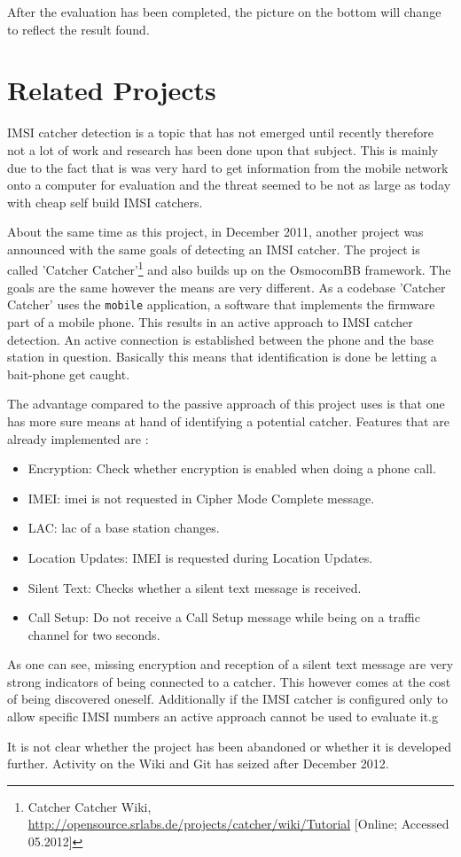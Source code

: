 After the evaluation has been completed, the picture on the bottom will change to reflect the result found.

\section{Related Projects}
IMSI catcher detection is a topic that has not emerged until recently therefore not a lot of work and research has been done upon that subject.
This is mainly due to the fact that is was very hard to get information from the mobile network onto a computer for evaluation and the threat seemed to be not as large as today with cheap self build IMSI catchers.

About the same time as this project, in December 2011, another project was announced with the same goals of detecting an IMSI catcher.
The project is called 'Catcher Catcher'\footnote{Catcher Catcher Wiki, \url{http://opensource.srlabs.de/projects/catcher/wiki/Tutorial} [Online; Accessed 05.2012]} and also builds up on the OsmocomBB framework.
The goals are the same however the means are very different.
As a codebase 'Catcher Catcher' uses the \texttt{mobile} application, a software that implements the firmware part of a mobile phone.
This results in an active approach to IMSI catcher detection.
An active connection is established between the phone and the base station in question.
Basically this means that identification is done be letting a bait-phone get caught.

The advantage compared to the passive approach of this project uses is that one has more sure means at hand of identifying a potential catcher.
Features that are already implemented are \cite{catcher_catcher}:
\begin{itemize}
	\item Encryption: Check whether encryption is enabled when doing a phone call.
	\item IMEI: \gls{imei} is not requested in Cipher Mode Complete message.
	\item LAC: \gls{lac} of a base station changes.
	\item Location Updates: IMEI is requested during Location Updates.
	\item Silent Text: Checks whether a silent text message is received.
	\item Call Setup: Do not receive a Call Setup message while being on a traffic channel for two seconds.
\end{itemize}
As one can see, missing encryption and reception of a silent text message are very strong indicators of being connected to a catcher.
This however comes at the cost of being discovered oneself.
Additionally if the IMSI catcher is configured only to allow specific IMSI numbers an active approach cannot be used to evaluate it.g

It is not clear whether the project has been abandoned or whether it is developed further.
Activity on the Wiki and Git has seized after December 2012.